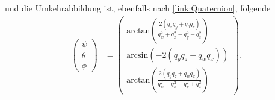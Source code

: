 und die Umkehrabbildung ist, ebenfalls nach \ref{link:Quaternion}, folgende
\begin{align}
	\begin{pmatrix}
		\psi\\
		\theta\\
		\phi
	\end{pmatrix}
	&= 
	\begin{pmatrix}
		\text{arctan}\left (\frac{2(q_xq_y + q_0q_z)}{q_w ^ 2 + q_x ^ 2 - q_y ^ 2 - q_z ^ 2}\right )\\
		\text{arcsin}\left (-2(q_yq_z + q_wq_x)\right )\\
		\text{arctan}\left (\frac{2(q_yq_z+q_wq_x)}{q_w ^ 2 - q_x ^ 2 - q_y ^ 2 + q_z ^ 2}\right )
	\end{pmatrix}.
\end{align}
